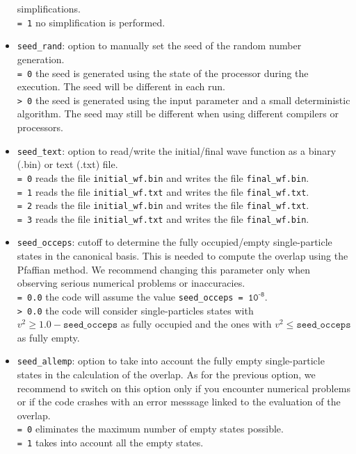\documentclass[a4paper,11pt]{article}
\newcommand{\ttt}[1]{\texttt{#1}}
\begin{document}
\begin{itemize}
 simplifications. \\[0.05cm]
 \ttt{= 1\:} no simplification is performed.
\item \ttt{seed\_rand}: option to manually set the seed of the random number generation. \\[0.05cm]
 \ttt{= 0\:} the seed is generated using the state of the processor during the execution. The seed will be different in each run. \\[0.05cm]
 \ttt{> 0\:} the seed is generated using the input parameter and a small deterministic algorithm. The seed may still be different when using different compilers or processors. 
\item \ttt{seed\_text}: option to read/write the initial/final wave function as a binary (.bin) or text (.txt) file. \\[0.05cm]
 \ttt{= 0\:} reads the file \ttt{initial\_wf.bin} and writes the file \ttt{final\_wf.bin}. \\[0.05cm]
 \ttt{= 1\:} reads the file \ttt{initial\_wf.txt} and writes the file \ttt{final\_wf.txt}. \\[0.05cm]
 \ttt{= 2\:} reads the file \ttt{initial\_wf.bin} and writes the file \ttt{final\_wf.txt}. \\[0.05cm]
 \ttt{= 3\:} reads the file \ttt{initial\_wf.txt} and writes the file \ttt{final\_wf.bin}. 
\item \ttt{seed\_occeps}: cutoff to determine the fully occupied/empty single-particle states in the canonical basis. 
 This is needed to compute the overlap using the Pfaffian method. We recommend changing this parameter only when observing
 serious numerical problems or inaccuracies. \\[0.05cm]
 \ttt{= 0.0\:} the code will assume the value \ttt{seed\_occeps = ${\ttt{10}}^{\ttt{-8}}$}. \\[0.05cm]
 \ttt{> 0.0\:} the code will consider single-particles states with $v^2 \ge 1.0 - \ttt{seed\_occeps}$ as fully occupied and 
 the ones with $v^2 \le \ttt{seed\_occeps}$ as fully empty. 
\item \ttt{seed\_allemp}: option to take into account the fully empty single-particle states in the calculation of the overlap. As for the previous option, we recommend to switch on this 
 option only if you encounter numerical problems or if the code crashes with an error messsage linked to the evaluation of the overlap. \\[0.05cm]
 \ttt{= 0\:} eliminates the maximum number of empty states possible. \\[0.05cm]
 \ttt{= 1\:} takes into account all the empty states.
\end{itemize}
\end{document}
